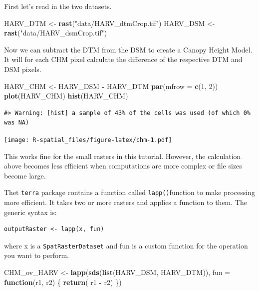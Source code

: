 \documentclass[
]{book}
\newenvironment{Shaded}{\begin{snugshade}}{\end{snugshade}}
\newcommand{\AttributeTok}[1]{\textcolor[rgb]{0.13,0.29,0.53}{#1}}
\newcommand{\ControlFlowTok}[1]{\textcolor[rgb]{0.13,0.29,0.53}{\textbf{#1}}}
\newcommand{\DecValTok}[1]{\textcolor[rgb]{0.00,0.00,0.81}{#1}}
\newcommand{\FunctionTok}[1]{\textcolor[rgb]{0.13,0.29,0.53}{\textbf{#1}}}
\newcommand{\NormalTok}[1]{#1}
\newcommand{\OtherTok}[1]{\textcolor[rgb]{0.56,0.35,0.01}{#1}}
\newcommand{\SpecialCharTok}[1]{\textcolor[rgb]{0.81,0.36,0.00}{\textbf{#1}}}
\newcommand{\StringTok}[1]{\textcolor[rgb]{0.31,0.60,0.02}{#1}}
\begin{document}
First let's read in the two datasets.

\begin{Shaded}
\begin{Highlighting}[]
\NormalTok{HARV\_DTM }\OtherTok{\textless{}{-}} \FunctionTok{rast}\NormalTok{(}\StringTok{"data/HARV\_dtmCrop.tif"}\NormalTok{)}
\NormalTok{HARV\_DSM }\OtherTok{\textless{}{-}} \FunctionTok{rast}\NormalTok{(}\StringTok{"data/HARV\_dsmCrop.tif"}\NormalTok{)}
\end{Highlighting}
\end{Shaded}

Now we can subtract the DTM from the DSM to create a Canopy Height Model. It will for each CHM pixel calculate the difference of the respective DTM and DSM pixels.

\begin{Shaded}
\begin{Highlighting}[]
\NormalTok{HARV\_CHM }\OtherTok{\textless{}{-}}\NormalTok{ HARV\_DSM }\SpecialCharTok{{-}}\NormalTok{ HARV\_DTM}
\FunctionTok{par}\NormalTok{(}\AttributeTok{mfrow =} \FunctionTok{c}\NormalTok{(}\DecValTok{1}\NormalTok{, }\DecValTok{2}\NormalTok{))}
\FunctionTok{plot}\NormalTok{(HARV\_CHM)}
\FunctionTok{hist}\NormalTok{(HARV\_CHM)}
\end{Highlighting}
\end{Shaded}

\begin{verbatim}
#> Warning: [hist] a sample of 43% of the cells was used (of which 0% was NA)
\end{verbatim}

\texttt{[image: R-spatial\_files/figure-latex/chm-1.pdf]}

This works fine for the small rasters in this tutorial. However, the calculation above becomes less efficient when computations are more complex or file sizes become large.

Thet \texttt{terra} package contains a function called \texttt{lapp()}function to make processing more efficient. It takes two or more rasters and applies a function to them. The generic syntax is:

\begin{verbatim}
outputRaster <- lapp(x, fun)
\end{verbatim}

where x is a \texttt{SpatRasterDataset} and fun is a custom function for the operation you want to perform.

\begin{Shaded}
\begin{Highlighting}[]
\NormalTok{CHM\_ov\_HARV }\OtherTok{\textless{}{-}} \FunctionTok{lapp}\NormalTok{(}\FunctionTok{sds}\NormalTok{(}\FunctionTok{list}\NormalTok{(HARV\_DSM, HARV\_DTM)), }
                    \AttributeTok{fun =} \ControlFlowTok{function}\NormalTok{(r1, r2) \{ }
                      \FunctionTok{return}\NormalTok{( r1 }\SpecialCharTok{{-}}\NormalTok{ r2) }
\NormalTok{                      \})}
\end{Highlighting}
\end{Shaded}
\end{document}
